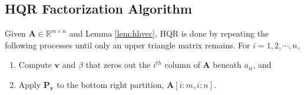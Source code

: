\documentclass[review,onefignum,onetabnum]{siamart190516}
\newcommand{\R}{\mathbb{R}}
\newcommand{\bb}[1]{\mathbf{#1}}
\begin{document}
\subsection{HQR Factorization Algorithm}
\label{sec:HQRfA}
Given $\bb{A}\in\R^{m\times n}$ and Lemma \ref{lem:hhvec}, HQR is done by repeating the following processes until only an upper triangle matrix remains.
For $i = 1, 2, \cdots, n,$
\begin{enumerate}[Step 1)]
	\item Compute $\bb{v}$ and $\beta$ that zeros out the $i^{th}$ column of $\bb{A}$ beneath $a_{ii}$, and
	\item Apply $\bb{P}_{\bb{v}}$ to the bottom right partition, $\bb{A}[i:m, i:n]$.
\end{enumerate}
\end{document}
